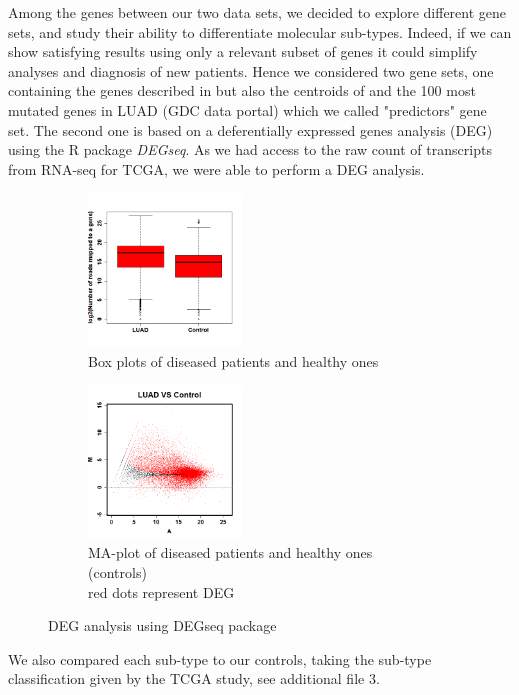 \documentclass[twocolumn,12pt]{article}
\begin{document}
Among the genes between our two data sets, we decided to explore different gene sets, and study their ability to differentiate molecular sub-types. Indeed, if we can show satisfying results using only a relevant subset of genes it could simplify analyses and diagnosis of new patients.
Hence we considered two gene sets, one containing the genes described in \cite{hayes} but also the centroids of \cite{wilk} and the 100 most mutated genes in LUAD (GDC data portal) which we called "predictors" gene set. The second one is based on a deferentially expressed genes analysis (DEG) using the R package \emph{DEGseq}.
As we had access to the raw count of transcripts from RNA-seq for TCGA, we were able to perform a DEG analysis.
\begin{figure}[th]
    \centering
    \begin{subfigure}[t]{0.20\textwidth}
        \centering
        \includegraphics[height=1.6in]{img/SampleS_box.png}
        \caption{Box plots of diseased patients and healthy ones}
        \label{fig:my_label}
    \end{subfigure}
    \begin{subfigure}[t]{0.20\textwidth}
        \centering
        \includegraphics[height=1.6in]{img/result.png}
        \caption{MA-plot of diseased patients and healthy ones (controls)\\
        red dots represent DEG}
        \label{fig:my_label}
    \end{subfigure}
    \caption{DEG analysis using DEGseq package}
    \label{fig:my_label}
\end{figure}
We also compared each sub-type to our controls, taking the sub-type classification given by the TCGA study\cite{TCGA}, see additional file 3.
\end{document}
